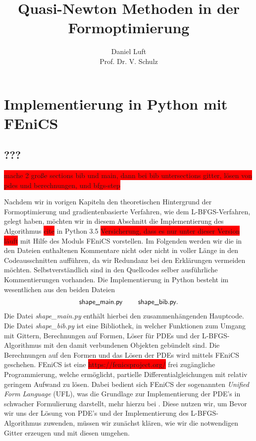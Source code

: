 \documentclass[bibliography=totoc,12pt,a4paper]{scrartcl}
\theoremstyle{exampstyle}
\numberwithin{equation}{section}
\begin{document}
\title{Quasi-Newton Methoden in der Formoptimierung}

\author{Daniel Luft \\ Prof. Dr. V. Schulz}

  \pagestyle{empty}

  \pagestyle{headings}
  

\section{Implementierung in Python mit FEniCS}
\subsection{???}

\colorbox{red}{mache 2 große sections bib und main, dann bei bib untersections gitter, lösen von pdes und berechnungen, und bfgs-step}

Nachdem wir in vorigen Kapiteln den theoretischen Hintergrund der Formoptimierung und gradientenbasierte Verfahren, wie dem L-BFGS-Verfahren, gelegt haben, möchten wir in diesem Abschnitt die Implementierung des Algorithmus \colorbox{red}{cite} in Python 3.5 \colorbox{red}{Versicherung, dass es nur unter dieser Version läuft} mit Hilfe des Moduls FEniCS vorstellen. Im Folgenden werden wir die in den Dateien enthaltenen Kommentare nicht oder nicht in voller Länge in den Codeausschnitten aufführen, da wir Redundanz bei den Erklärungen vermeiden möchten. Selbstverständlich sind in den Quellcodes selber ausführliche Kommentierungen vorhanden. Die Implementierung in Python besteht im wesentlichen aus den beiden Dateien
\begin{align*}
\textsf{shape\_main.py} \hspace{0.8cm} \textsf{shape\_bib.py}.
\end{align*}
Die Datei \textit{shape\_main.py} enthält hierbei den zusammenhängenden Hauptcode. Die Datei \textit{shape\_bib.py} ist eine Bibliothek, in welcher Funktionen zum Umgang mit Gittern, Berechnungen auf Formen, Löser für PDEs und der L-BFGS-Algorithmus mit den damit verbundenen Objekten gebündelt sind. Die Berechnungen auf den Formen und das Lösen der PDEs wird mittels FEniCS geschehen.
FEniCS ist eine \colorbox{red}{https://fenicsproject.org/} frei zugängliche Programmierung, welche ermöglicht, partielle Differentialgleichungen mit relativ geringem Aufwand zu lösen. Dabei bedient sich FEniCS der sogenannten \textit{Unified Form Language} (UFL), was die Grundlage zur Implementierung der PDE's in schwacher Formulierung darstellt, mehr hierzu bei \cite{Unifiedformlanguage}. Diese nutzen wir, um 
Bevor wir uns der Lösung von PDE's und der Implementierung des L-BFGS-Algorithmus zuwenden, müssen wir zunächst klären, wie wir die notwendigen Gitter erzeugen und mit diesen umgehen.
\end{document}
